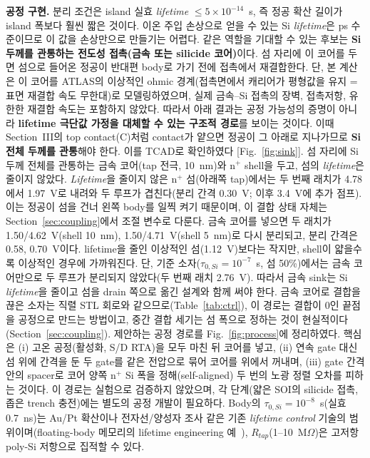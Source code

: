 \documentclass[journal]{IEEEtran}
\begin{document}
\textbf{공정 구현.} 분리 조건은 island 실효 \textit{lifetime} $\le5\times10^{-14}$~s, 즉 정공 확산 길이가 island 폭보다 훨씬 짧은 것이다. 이온 주입 손상으로 얻을 수 있는 Si \textit{lifetime}은 ps 수준이므로 이 값을 손상만으로 만들기는 어렵다. 같은 역할을 기대할 수 있는 후보는 \textbf{Si 두께를 관통하는 전도성 접촉(금속 또는 silicide 코어)}이다. 섬 자리에 이 코어를 두면 섬으로 들어온 정공이 반대편 body로 가기 전에 접촉에서 재결합한다. 단, 본 계산은 이 코어를 ATLAS의 이상적인 ohmic 경계(접촉면에서 캐리어가 평형값을 유지 = 표면 재결합 속도 무한대)로 모델링하였으며, 실제 금속--Si 접촉의 장벽, 접촉저항, 유한한 재결합 속도는 포함하지 않았다. 따라서 아래 결과는 공정 가능성의 증명이 아니라 \textbf{lifetime 극단값 가정을 대체할 수 있는 구조적 경로}를 보이는 것이다. 이때 Section~III의 top contact(C)처럼 contact가 얕으면 정공이 그 아래로 지나가므로 \textbf{Si 전체 두께를 관통}해야 한다. 이를 TCAD로 확인하였다 [Fig.~\ref{fig:sink}]. 섬 자리에 Si 두께 전체를 관통하는 금속 코어(tap 전극, 10~nm)와 n$^+$ shell을 두고, 섬의 \textit{lifetime}은 줄이지 않았다. \textit{Lifetime}을 줄이지 않은 n$^+$ 섬(아래쪽 tap)에서는 두 번째 래치가 4.78에서 1.97~V로 내려와 두 루프가 겹친다(분리 간격 0.30~V; 이후 3.4~V에 추가 점프). 이는 정공이 섬을 건너 왼쪽 body를 일찍 켜기 때문이며, 이 결합 상태 자체는 Section~\ref{sec:coupling}에서 조절 변수로 다룬다. 금속 코어를 넣으면 두 래치가 1.50/4.62~V(shell 10~nm), 1.50/4.71~V(shell 5~nm)로 다시 분리되고, 분리 간격은 0.58, 0.70~V이다. lifetime을 줄인 이상적인 섬(1.12~V)보다는 작지만, shell이 얇을수록 이상적인 경우에 가까워진다. 단, 기준 소자($\tau_{0,Si}=10^{-7}$~s, 섬 50\%)에서는 금속 코어만으로 두 루프가 분리되지 않았다(두 번째 래치 2.76~V). 따라서 금속 sink는 Si \textit{lifetime}을 줄이고 섬을 drain 쪽으로 옮긴 설계와 함께 써야 한다. 금속 코어로 결합을 끊은 소자는 직렬 STL 회로와 같으므로(Table~\ref{tab:ctrl}), 이 경로는 결합이 0인 끝점을 공정으로 만드는 방법이고, 중간 결합 세기는 섬 폭으로 정하는 것이 현실적이다(Section~\ref{sec:coupling}). 제안하는 공정 경로를 Fig.~\ref{fig:process}에 정리하였다. 핵심은 (i) 고온 공정(활성화, S/D RTA)을 모두 마친 뒤 코어를 넣고, (ii) 연속 gate 대신 섬 위에 간격을 둔 두 gate를 같은 전압으로 묶어 코어를 위에서 꺼내며, (iii) gate 간격 안의 spacer로 코어 양쪽 n$^+$ Si 폭을 정해(self-aligned) 두 번의 노광 정렬 오차를 피하는 것이다. 이 경로는 실험으로 검증하지 않았으며, 각 단계(얇은 SOI의 silicide 접촉, 좁은 trench 충전)에는 별도의 공정 개발이 필요하다. Body의 $\tau_{0,Si}=10^{-8}$~s(실효 0.7~ns)는 Au/Pt 확산이나 전자선/양성자 조사 같은 기존 \textit{lifetime control} 기술의 범위이며(floating-body 메모리의 lifetime engineering 예~\cite{kim_lifetime}), $R_{tap}$(1--10~M$\Omega$)은 고저항 poly-Si 저항으로 집적할 수 있다.
\end{document}
